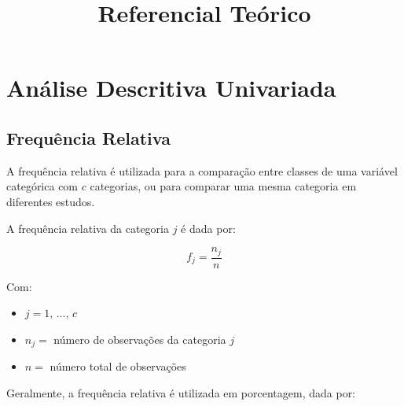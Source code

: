 \documentclass[
]{estat/estat}
\title{Referencial Teórico}
\author{}
\date{}
\renewcommand*\contentsname{Índice}
\newcommand\contentsname{Índice}
\begin{document}
\maketitle

\fancyhf{} 

\fancyhead[L]{} %
\renewcommand{\headrulewidth}{0pt}   %

\fancyfoot[R]{\textcolor{white}{\thepage}} %

\pagestyle{fancy} 

\renewcommand*\contentsname{Sumário}
{
\hypersetup{linkcolor=}
\setcounter{tocdepth}{3}
\tableofcontents
}

\section{Análise Descritiva
Univariada}\label{anuxe1lise-descritiva-univariada}

\subsection{Frequência Relativa}\label{frequuxeancia-relativa}

A frequência relativa é utilizada para a comparação entre classes de uma
variável categórica com \(c\) categorias, ou para comparar uma mesma
categoria em diferentes estudos.

A frequência relativa da categoria \(j\) é dada por:

\[
f_j=\frac{n_j}{n}
\]

Com:

\begin{itemize}
\item
  \(j = 1, \, ..., \, c\)
\item
  \(n_j =\) número de observações da categoria \(j\)
\item
  \(n =\) número total de observações
\end{itemize}

Geralmente, a frequência relativa é utilizada em porcentagem, dada por:
\end{document}
